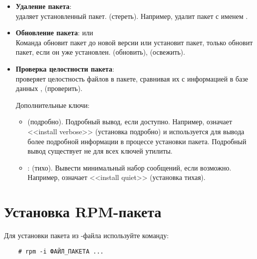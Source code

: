 \begin{itemize}
	\item \textbf{Удаление пакета}: \\
	 удаляет установленный пакет. 
	(стереть). Например,  удалит пакет с именем .

	\item \textbf{Обновление пакета}:  или \\
	Команда  обновит пакет до новой версии или установит пакет, 
	только обновит пакет, если он уже установлен.  (обновить),  (освежить).

	\item \textbf{Проверка целостности пакета}: \\
	 проверяет целостность файлов в пакете, сравнивая их с информацией в базе данных ,
	 (проверить).

	Дополнительные ключи:
	\begin{itemize}
		\item \textbf{} (подробно). Подробный вывод, если доступно. Например,  означает <<install verbose>>
	 (установка подробно) и используется для вывода более подробной информации в процессе установки пакета. Подробный вывод существует не для всех ключей утилиты.
		\item \textbf{}: (тихо). Вывести минимальный набор сообщений, если возможно. Например,  означает <<install quiet>> (установка тихая).
	\end{itemize}


\end{itemize}

\section{Установка RPM-пакета}

Для установки пакета из -файла используйте команду:
\begin{verbatim}
    # rpm -i ФАЙЛ_ПАКЕТА ...
\end{verbatim}

